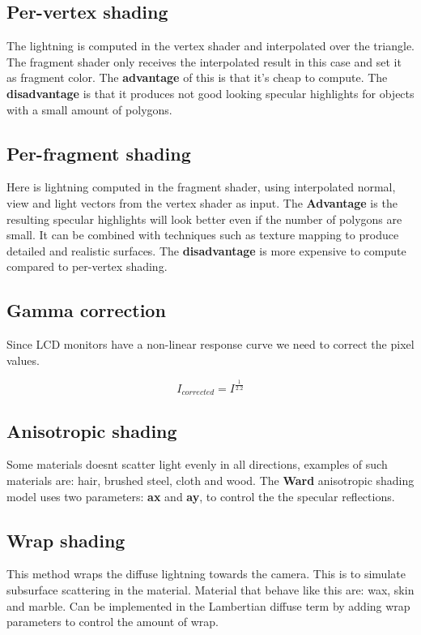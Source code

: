 	\subsection*{Per-vertex shading}
	The lightning is computed in the vertex shader and interpolated over the triangle. The fragment shader only receives the interpolated result in this case and set it as fragment color. The \textbf{advantage} of this is that it's cheap to compute. The \textbf{disadvantage} is that it produces not good looking specular highlights for objects with a small amount of polygons. 


	\subsection*{Per-fragment shading}
	Here is lightning computed in the fragment shader, using interpolated normal, view and light vectors from the vertex shader as input. The \textbf{Advantage} is the resulting specular highlights will look better even if the number of polygons are small. It can be combined with techniques such as texture mapping to produce detailed and realistic surfaces. The \textbf{disadvantage} is more expensive to compute compared to per-vertex shading. 

	\subsection*{Gamma correction}
	Since LCD monitors have a non-linear response curve we need to correct the pixel values. 

		\begin{equation}
			I_{corrected} = I^{\frac{1} {2.2} }		
		\end{equation}

	\subsection*{Anisotropic shading}
	Some materials doesnt scatter light evenly in all directions, examples of such materials are: hair, brushed steel, cloth and wood. The \textbf{Ward} anisotropic shading model uses two parameters: \textbf{ax} and \textbf{ay}, to control the the specular reflections. 

	\subsection*{Wrap shading}
	This method wraps the diffuse lightning towards the camera. This is to simulate subsurface scattering in the material. Material that behave like this are: wax, skin and marble. Can be implemented in the Lambertian diffuse term by adding wrap parameters to control the amount of wrap. 

